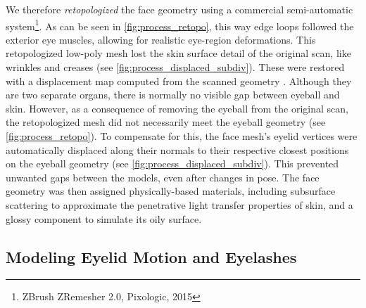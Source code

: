 
We therefore \emph{retopologized} the face geometry
using a commercial semi-automatic system\footnote{ZBrush ZRemesher 2.0, Pixologic, 2015}.
As can be seen in \autoref{fig:process_retopo}, this way edge loops followed the exterior eye muscles, allowing for realistic eye-region deformations.
This retopologized low-poly mesh lost the skin surface detail of the original scan, like wrinkles and creases (see \autoref{fig:process_displaced_subdiv}).
These were restored with a displacement map computed from the scanned geometry \cite{lee2000displaced}.
Although they are two separate organs, there is normally no visible gap between eyeball and skin.
However, as a consequence of removing the eyeball from the original scan, the retopologized mesh did not necessarily meet the eyeball geometry (see \autoref{fig:process_retopo}).
To compensate for this, the face mesh's eyelid vertices were automatically displaced along their normals to their respective closest positions on the eyeball geometry (see \autoref{fig:process_displaced_subdiv}).
This prevented unwanted gaps between the models, even after changes in pose.
The face geometry was then assigned physically-based materials, including subsurface scattering to approximate the penetrative light transfer properties of skin, and a glossy component to simulate its oily surface.

\subsection{Modeling Eyelid Motion and Eyelashes}

